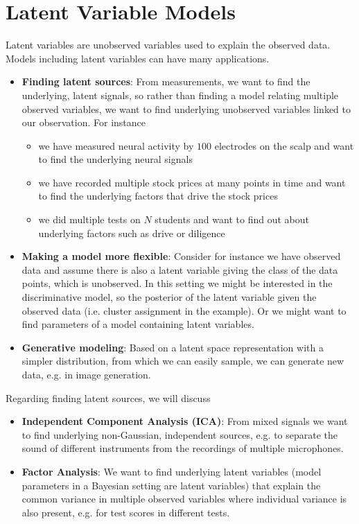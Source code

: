 \section{Latent Variable Models}
\thispagestyle{plain}

Latent variables are unobserved variables used to explain the observed data.
Models including latent variables can have many applications.

\begin{itemize}
    \item \textbf{Finding latent sources}: From measurements, we want to find the underlying, latent signals, so rather
    than finding a model relating multiple observed variables, we want to find
    underlying unobserved variables linked to our observation. For instance
    \begin{itemize}
        \item we have measured neural activity by $100$ electrodes on the scalp and want to find the underlying neural signals
        \item we have recorded multiple stock prices at many points in time and want to find the underlying factors that drive the stock prices
        \item we did multiple tests on $N$ students and want to find out about underlying factors such as drive or diligence
    \end{itemize}
    \item \textbf{Making a model more flexible}: Consider for instance we have observed data and 
    assume there is also a latent variable giving the class of the data points, which is unobserved.
    In this setting we might be interested in the discriminative model, so the posterior of
    the latent variable given the observed data (i.e. cluster assignment in the example). Or we might want to find parameters of a model
    containing latent variables.
    \item \textbf{Generative modeling}: Based on a latent space representation with a simpler distribution,
    from which we can easily sample, we can generate new data, e.g. in image generation.
\end{itemize}

Regarding finding latent sources, we will discuss

\begin{itemize}
    \item \textbf{Independent Component Analysis (ICA)}: From mixed signals we want to find underlying non-Gaussian, independent sources, e.g. 
    to separate the sound of different instruments from the recordings of multiple microphones.
    \item \textbf{Factor Analysis}: We want to find underlying latent variables (model parameters in a Bayesian setting are latent variables) that explain the common variance in multiple observed variables where
    individual variance is also present, e.g. for test scores in different tests.
\end{itemize}

